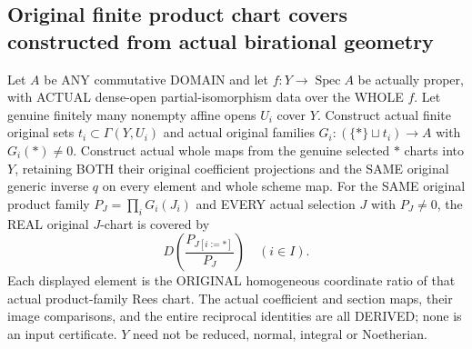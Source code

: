 \subsection{Original finite product chart covers constructed from actual birational geometry}

\begin{lemma}
\label{scheme:actual-birational-original-product-chart-cover}
\leanok
{}
Let $A$ be ANY commutative DOMAIN and let $f:Y\to\operatorname{Spec}A$ be
actually proper, with ACTUAL dense-open partial-isomorphism data over the
WHOLE $f$.  Let genuine finitely many nonempty affine opens $U_i$ cover $Y$.
Construct actual finite original sets $t_i\subset\Gamma(Y,U_i)$ and actual
original families $G_i:(\{*\}\sqcup t_i)\to A$ with $G_i(*)\ne0$.
Construct actual whole maps from the genuine selected $*$ charts into $Y$,
retaining BOTH their original coefficient projections and the SAME original
generic inverse $q$ on every element and whole scheme map.
For the SAME original product family $P_J=\prod_iG_i(J_i)$ and EVERY actual
selection $J$ with $P_J\ne0$, the REAL original $J$-chart is covered by
\[
 D\left(\frac{P_{J[i:=*]}}{P_J}\right)\quad (i\in I).
\]
Each displayed element is the ORIGINAL homogeneous coordinate ratio of that
actual product-family Rees chart.  The actual coefficient and section maps,
their image comparisons, and the entire reciprocal identities are all
DERIVED; none is an input certificate.  $Y$ need not be reduced, normal,
integral or Noetherian.
\end{lemma}
